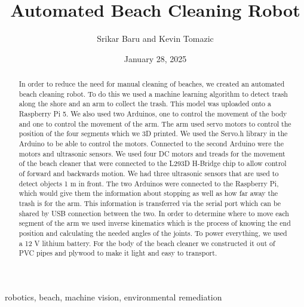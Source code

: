 \documentclass[12pt,conference,onecolumn]{IEEEtran}
\title{Automated Beach Cleaning Robot}
\author{Srikar Baru and Kevin Tomazic}
\date{January 28, 2025}
\begin{document}
\maketitle 

\begin{abstract}
In order to reduce the need for manual cleaning of beaches, we created an automated beach cleaning robot. To do this we used a machine learning algorithm to detect trash along the shore and an arm to collect the trash. This model was uploaded onto a Raspberry Pi 5. We also used two Arduinos, one to control the movement of the body and one to control the movement of the arm. The arm used servo motors to control the position of the four segments which we 3D printed. We used the Servo.h library in the Arduino to be able to control the motors. Connected to the second Arduino were the motors and ultrasonic sensors. We used four DC motors and treads for the movement of the beach cleaner that were connected to the L293D H-Bridge chip to allow control of forward and backwards motion. We had three ultrasonic sensors that are used to detect objects 1 m in front. The two Arduinos were connected to the Raspberry Pi, which would give them the information about stopping as well as how far away the trash is for the arm. This information is transferred via the serial port which can be shared by USB connection between the two. In order to determine where to move each segment of the arm we used inverse kinematics which is the process of knowing the end position and calculating the needed angles of the joints. To power everything, we used a 12 V lithium battery. For the body of the beach cleaner we constructed it out of PVC pipes and plywood to make it light and easy to transport.
\end{abstract}

\begin{IEEEkeywords}
robotics, beach, machine vision, environmental remediation
\end{IEEEkeywords}
\end{document}
